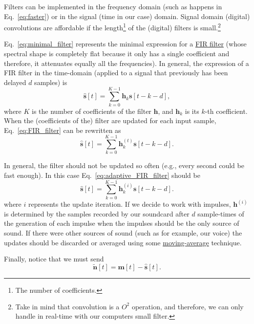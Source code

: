 Filters can be implemented in the frequency domain (such as happens in
Eq.~\eqref{eq:faster}) or in the signal (time in our case)
domain. Signal domain (digital) convolutions are affordable if the
length\footnote{The number of coefficients.} of the (digital) filters
is small.\footnote{Take in mind that convolution is a $O^2$ operation,
  and therefore, we can only handle in real-time with our computers
  small filter.}

Eq.~\eqref{eq:minimal_filter} represents the minimal expression for a
\href{https://en.wikipedia.org/wiki/Finite_impulse_response}{FIR
  filter} (whose spectral shape is completely flat because it only has
a single coefficient and therefore, it attenuates equally all the
frequencies). In general, the expression of a FIR filter in the
time-domain (applied to a signal that previously has been delayed $d$
samples) is
\begin{equation}
  \hat{\mathbf s}[t] = \sum_{k=0}^{K-1}{\mathbf h}_k{\mathbf s}[t-k-d],
  \label{eq:FIR_filter}
\end{equation}
where $K$ is the number of coefficients of the filter ${\mathbf h}$,
and ${\mathbf h}_k$ is its $k$-th coefficient. When the (coefficients
of the) filter are updated for each input sample,
Eq.~\eqref{eq:FIR_filter} can be rewritten as
\begin{equation}
  \hat{\mathbf s}[t] = \sum_{k=0}^{K-1}{\mathbf h}_k^{(t)}{\mathbf s}[t-k-d].
  \label{eq:adaptive_FIR_filter}
\end{equation}

In general, the filter should not be updated so often (e.g., every
second could be fast enough). In this case
Eq.~\eqref{eq:adaptive_FIR_filter} should be
\begin{equation}
  \hat{\mathbf s}[t] = \sum_{k=0}^{K-1}{\mathbf h}_k^{(i)}{\mathbf s}[t-k-d].
  \label{eq:adaptive_FIR_filter_second}
\end{equation}
where $i$ represents the update iteration.
If we decide to work with impulses, ${\mathbf h}^{(i)}$ is determined
by the samples recorded by our soundcard after $d$ sample-times of the
generation of each impulse when the impulses should be the only source
of sound. If there were other sources of sound (such as for example,
our voice) the updates should be discarded or averaged using some
\href{https://en.wikipedia.org/wiki/Moving_average}{moving-average}
technique.

Finally, notice that we must send
\begin{equation}
  \tilde{\mathbf n}[t] = \mathbf{m}[t] - \hat{\mathbf s}[t].
  \label{eq:finally}
\end{equation}


